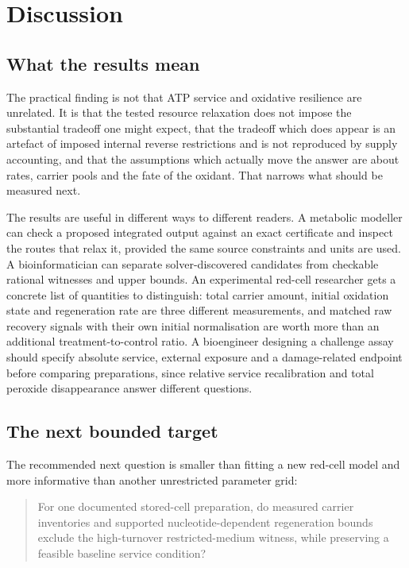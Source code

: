 \documentclass[11pt,a4paper]{article}
\theoremstyle{plain}
\theoremstyle{definition}
\theoremstyle{remark}
\begin{document}
\section{Discussion}\label{sec:discussion}

\subsection{What the results mean}
The practical finding is not that ATP service and oxidative resilience are
unrelated. It is that the tested resource relaxation does not impose the
substantial tradeoff one might expect, that the tradeoff which does appear is
an artefact of imposed internal reverse restrictions and is not reproduced by
supply accounting, and that the assumptions which actually move the answer are
about rates, carrier pools and the fate of the oxidant. That narrows what
should be measured next.

The results are useful in different ways to different readers. A metabolic
modeller can check a proposed integrated output against an exact certificate
and inspect the routes that relax it, provided the same source constraints and
units are used. A bioinformatician can separate solver-discovered candidates
from checkable rational witnesses and upper bounds. An experimental
red-cell researcher gets a concrete list of quantities to distinguish: total
carrier amount, initial oxidation state and regeneration rate are three
different measurements, and matched raw recovery signals with their own initial
normalisation are worth more than an additional treatment-to-control ratio. A
bioengineer designing a challenge assay should specify absolute service,
external exposure and a damage-related endpoint before comparing preparations,
since relative service recalibration and total peroxide disappearance answer
different questions.

\subsection{The next bounded target}
The recommended next question is smaller than fitting a new red-cell model and
more informative than another unrestricted parameter grid:

\begin{quote}
For one documented stored-cell preparation, do measured carrier inventories and
supported nucleotide-dependent regeneration bounds exclude the high-turnover
restricted-medium witness, while preserving a feasible baseline service
condition?
\end{quote}
\end{document}
